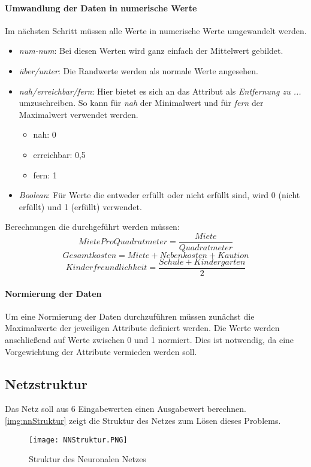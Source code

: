 \paragraph{Umwandlung der Daten in numerische Werte}
Im nächsten Schritt müssen alle Werte in numerische Werte umgewandelt werden. 
\begin{itemize}
    \item \textit{num-num}: Bei diesen Werten wird ganz einfach der Mittelwert gebildet. 
    \item \textit{über/unter}: Die Randwerte werden als normale Werte angesehen. 
    \item \textit{nah/erreichbar/fern}: Hier bietet es sich an das Attribut als \textit{Entfernung zu ...} umzuschreiben. 
                So kann für \textit{nah} der Minimalwert und für \textit{fern} der Maximalwert verwendet werden.
    \begin{itemize}
        \item nah: 0
        \item erreichbar: 0,5
        \item fern: 1
    \end{itemize}
    \item \textit{Boolean}: Für Werte die entweder erfüllt oder nicht erfüllt sind, wird 0 (nicht erfüllt) und 1 (erfüllt) verwendet.
\end{itemize}

Berechnungen die durchgeführt werden müssen: 
\begin{equation}
        MieteProQuadratmeter = \frac{Miete}{Quadratmeter}
\end{equation}
\begin{equation}
    Gesamtkosten = Miete + Nebenkosten + Kaution
\end{equation}
\begin{equation}
    Kinderfreundlichkeit = \frac{Schule + Kindergarten}{2}
\end{equation}

\paragraph{Normierung der Daten}
Um eine Normierung der Daten durchzuführen müssen zunächst die Maximalwerte der 
jeweiligen Attribute definiert werden. Die Werte werden anschließend auf Werte 
zwischen 0 und 1 normiert. Dies ist notwendig, da eine Vorgewichtung der Attribute
vermieden werden soll.

\subsection{Netzstruktur}
Das Netz soll aus $6$ Eingabewerten einen Ausgabewert berechnen. 
\autoref{img:nnStruktur} zeigt die Struktur des Netzes zum Lösen 
dieses Problems. 
\begin{figure}[h]
    \centering
    \texttt{[image: NNStruktur.PNG]}
    \label{img:nnStruktur}
    \caption{Struktur des Neuronalen Netzes}
\end{figure}

